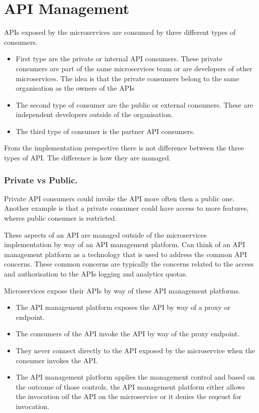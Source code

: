 \section{API Management}
APIs exposed by the microservices are consumed by three different types of consumers.
\begin{itemize}
    \item First type are the private or internal API consumers. These private consumers are part of the same microservices team or are developers of other microservices. The idea is that the private consumers belong to the same organisation as the owners of the APIs
    \item The second type of consumer are the public or external consumers. These are independent developers outside of the organisation.
    \item The third type of consumer is the partner API consumers.
\end{itemize}

\begin{note}
    From the implementation perspective there is not difference between the three types of API.
    The difference is how they are managed.
\end{note}

\subsubsection{Private vs Public.}
Private API consumers could invoke the API more often then a public one.
Another example is that a private consumer could have access to more features, wheres public consumer is restricted.

These aspects of an API are managed outside of the microservices implementation by way of an API management platform.
Can think of an API management platform as a technology that is used to address the common API concerns.
These common concerns are typically the concerns related to the access and authorisation to the APIs logging and analytics quotas.

Microservices expose their APIs by way of these API management platforms.
\begin{itemize}
    \item The API management platform exposes the API by way of a proxy or endpoint.
    \item The consumers of the API invoke the API by way of the proxy endpoint.
    \item They never connect directly to the API exposed by the microservice when the consumer invokes the API.
    \item The API management platform applies the management control and based on the outcome of those controls, the API management platform either allows the invocation oif the API on the microservice or it denies the reqeust for invocation.
\end{itemize}

